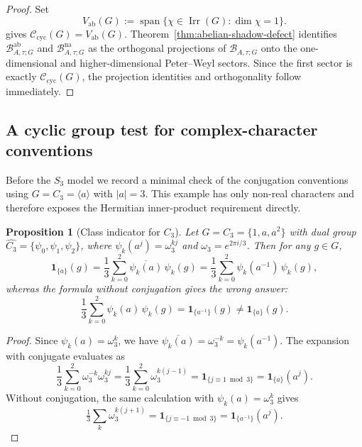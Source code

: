 \documentclass[11pt,a4paper]{amsart}
\theoremstyle{plain}
\newtheorem{proposition}[theorem]{Proposition}
\theoremstyle{definition}
\theoremstyle{remark}
\DeclareMathOperator{\Irr}{Irr}
\begin{document}
\begin{proof}
  Set
  \[
    V_{\mathrm{ab}}(G)
    :=
    \operatorname{span}\{\chi\in\Irr(G):\dim\chi=1\}.
  \]
   gives
  \(\mathscr C_{\mathrm{cyc}}(G)=V_{\mathrm{ab}}(G)\).
  Theorem~\ref{thm:abelian-shadow-defect} identifies
  \(\mathcal B_{A,\tau;G}^{\mathrm{ab}}\) and \(\mathcal B_{A,\tau;G}^{\mathrm{na}}\) as
  the orthogonal projections of \(\mathcal B_{A,\tau;G}\) onto the
  one-dimensional and higher-dimensional Peter--Weyl sectors. Since the
  first sector is exactly \(\mathscr C_{\mathrm{cyc}}(G)\), the
  projection identities and orthogonality follow immediately.
\end{proof}

\subsection{A cyclic group test for complex-character conventions}

Before the \(S_3\) model we record a minimal check of the conjugation
conventions using \(G=C_3=\langle a\rangle\) with \(|a|=3\). This
example has only non-real characters and therefore exposes the
Hermitian inner-product requirement directly.

\begin{proposition}[Class indicator for \(C_3\)]
  \label{prop:c3-class-indicator-check}
  Let \(G=C_3=\{1,a,a^2\}\) with dual group
  \(\widehat{C_3}=\{\psi_0,\psi_1,\psi_2\}\), where
  \(\psi_k(a^j)=\omega_3^{kj}\) and \(\omega_3=e^{2\pi i/3}\).
  Then for any \(g\in G\),
  \[
    \mathbf 1_{\{a\}}(g)
    =\frac{1}{3}\sum_{k=0}^{2}\overline{\psi_k(a)}\,\psi_k(g)
    =\frac{1}{3}\sum_{k=0}^{2}\psi_k(a^{-1})\,\psi_k(g),
  \]
  whereas the formula without conjugation gives the wrong answer:
  \[
    \frac{1}{3}\sum_{k=0}^{2}\psi_k(a)\,\psi_k(g)
    =\mathbf 1_{\{a^{-1}\}}(g)
    \ne \mathbf 1_{\{a\}}(g).
  \]
\end{proposition}

\begin{proof}
  Since \(\psi_k(a)=\omega_3^k\), we have \(\overline{\psi_k(a)}=\omega_3^{-k}=\psi_k(a^{-1})\).
  The expansion with conjugate evaluates as
  \[
    \frac{1}{3}\sum_{k=0}^{2}\omega_3^{-k}\omega_3^{kj}
    =\frac{1}{3}\sum_{k=0}^{2}\omega_3^{k(j-1)}
    =\mathbf 1_{\{j\equiv 1\bmod 3\}}
    =\mathbf 1_{\{a\}}(a^j).
  \]
  Without conjugation, the same calculation with
  \(\psi_k(a)=\omega_3^k\) gives
  \[
    \tfrac{1}{3}\sum_k\omega_3^{k(j+1)}
    =\mathbf 1_{\{j\equiv -1\bmod 3\}}
    =\mathbf 1_{\{a^{-1}\}}(a^j).
  \]
\end{proof}
\end{document}
